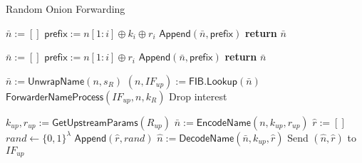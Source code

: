\documentclass{llncs}
\begin{document}
\begin{algorithm}[t]
  \caption{Random Onion Forwarding}
  \begin{algorithmic}[1]

    \State $\bar{n} := []$
    	\State $\mathsf{prefix} := n[1:i] \oplus k_i \oplus r_i$
    	\State $\mathsf{Append}(\bar{n}, \mathsf{prefix})$
    \EndFor
    \State \textbf{return} $\bar{n}$
\EndFunction

    \State $\bar{n} := []$
    	\State $\mathsf{prefix} := n[1:i] \oplus r_i$
    	\State $\mathsf{Append}(\bar{n}, \mathsf{prefix})$
    \EndFor
    \State \textbf{return} $\bar{n}$
\EndFunction

	\State $\bar{n} := \mathsf{UnwrapName}(n, s_R)$ %
		\State $(n, IF_{up}) := \mathsf{FIB}.\mathsf{Lookup}(\bar{n})$
		\State $\mathsf{ForwarderNameProcess}(IF_{up}, n, k_R)$
	\Else
		\State Drop interest
	\EndIf
\EndFunction

    \State $k_{up}, r_{up} := \mathsf{GetUpstreamParams}(R_{up})$
    \State $\bar{n} := \mathsf{EncodeName}(n, k_{up}, r_{up})$
    \State $\hat{r} := []$ %
    	\State $rand \gets \{0,1\}^{\lambda}$
    	\State $\mathsf{Append}(\hat{r}, rand)$
    \EndFor
    \State $\hat{n} := \mathsf{DecodeName}(\bar{n}, k_{up}, \hat{r})$ %
    \State Send $(\hat{n}, \hat{r})$ to $IF_{up}$
\EndFunction

\end{algorithmic}
\end{algorithm}

\medskip
\small


\end{document}
